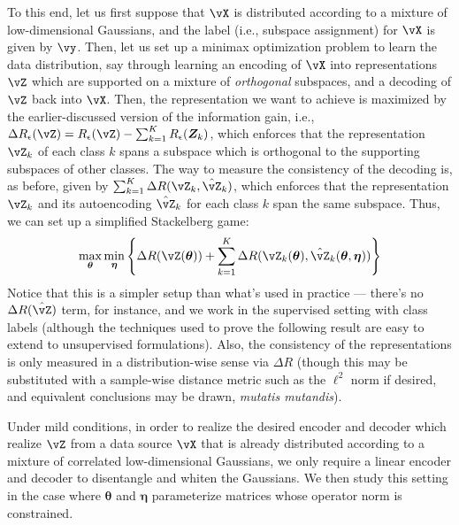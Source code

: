 \documentclass[../../book-main.tex]{subfiles}
\begin{document}
To this end, let us first suppose that \(\vX\) is distributed according to a mixture of low-dimensional Gaussians, and the label (i.e., subspace assignment) for \(\vX\) is given by \(\vy\). Then, let us set up a minimax optimization problem to learn the data distribution, say through learning an encoding of \(\vX\) into representations \(\vZ\) which are supported on a mixture of \textit{orthogonal} subspaces, and a decoding of \(\vZ\) back into \(\vX\). Then, the representation we want to achieve is maximized by the earlier-discussed version of the information gain, i.e., \( \Delta R_{\epsilon}(\vZ) = R_{\epsilon}(\vZ) - \sum_{k=1}^K R_{\epsilon}(\bm Z_k) \), which enforces that the representation \(\vZ_{k}\) of each class \(k\) spans a subspace which is orthogonal to the supporting subspaces of other classes. The way to measure the consistency of the decoding is, as before, given by \(\sum_{k = 1}^{K}\Delta R(\vZ_{k}, \hat{\vZ}_{k})\), which enforces that the representation \(\vZ_{k}\) and its autoencoding \(\hat{\vZ}_{k}\) for each class \(k\) span the same subspace. Thus, we can set up a simplified Stackelberg game:
\begin{equation}\label{eq:ctrl_msp_game}
    \max_{\bm \theta}\min_{\bm \eta}\bc{\Delta R(\vZ(\bm \theta)) + \sum_{k = 1}^{K}\Delta R(\vZ_{k}(\bm \theta), \hat{\vZ}_{k}(\bm \theta, \bm \eta))}
\end{equation}
Notice that this is a simpler setup than what's used in practice --- there's no \(\Delta R(\hat{\vZ})\) term, for instance, and we work in the supervised setting with class labels (although the techniques used to prove the following result are easy to extend to unsupervised formulations). Also, the consistency of the representations is only measured in a distribution-wise sense via \(\Delta R\) (though this may be substituted with a sample-wise distance metric such as the \(\ell^{2}\) norm if desired, and equivalent conclusions may be drawn, \textit{mutatis mutandis}).

Under mild conditions, in order to realize the desired encoder and decoder which realize \(\vZ\) from a data source \(\vX\) that is already distributed according to a mixture of correlated low-dimensional Gaussians, we only require a linear encoder and decoder to disentangle and whiten the Gaussians. We then study this setting in the case where \(\bm \theta\) and \(\bm \eta\) parameterize matrices whose operator norm is constrained. 
\end{document}
